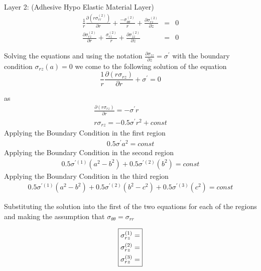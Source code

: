 \documentclass[11pt]{article} %
\makeatletter
\def \beg {\begin{equation}}
\def \en {\end{equation}}
\newcommand{\getproperty}[2]{%
  \expandafter\ifx\csname#1@p#2\endcsname\relax
  \else \csname#1@p#2\endcsname
  \fi
}%
\makeatother
\begin{document}
Layer 2: (Adhesive Hypo Elastic Material Layer)
		\beg
		\begin{aligned}
			\frac{1}{r}\frac{\partial(r\sigma_{rr}^{(2)})}{\partial r} + \frac {- \sigma_{\theta\theta}^{(2)}}{r} +  
					\frac{\partial \sigma_{rz}^{(2)}}{\partial z}  & =  &  0 \\
			\frac{\partial \sigma_{rz}^{(2)}}{\partial r} + \frac {\sigma_{rz}^{(2)}}{r} +  
					\frac{\partial \sigma_{zz}^{(2)}}{\partial z} & = & 0
		\end{aligned}
		\en

Solving the equations and using the notation $ \frac{\partial \sigma_{zz}}{\partial z}  = \sigma^{'}$  with the boundary condition $ \sigma_{rz} (a) = 0 $ we come to the following solution of the equation
	\beg
	\frac{1}{r}\frac{\partial (r\sigma_{rz})}{\partial r} +  \sigma^{'}   = 0
	\en

as 
	\beg
		\begin{aligned}
			\frac{\partial (r\sigma_{rz})}{\partial r} = -\sigma^{'}{r} \\
			r\sigma_{rz} =  -0.5 \sigma^{'}{r}^{2} + const 
		\end{aligned}
	\en
	Applying the Boundary Condition in the first region 
	\beg
		\begin{aligned}
			0.5 \sigma^{'}{a}^{2} =  const 
		\end{aligned}
	\en
	Applying the Boundary Condition in the second region 
	\beg
		\begin{aligned}
			0.5 \sigma^{'(1)}({a}^{2} - {b}^{2}) + 0.5 \sigma ^{'(2)}({b}^{2}) =  const 
		\end{aligned}
	\en
	Applying the Boundary Condition in the third region 
	\beg
		\begin{aligned}
			0.5 \sigma^{'(1)}({a}^{2} - {b}^{2}) + 0.5 \sigma ^{'(2)}({b}^{2} - {c}^{2}) + 0.5 \sigma ^{'(3)}({c}^2)=  const  
		\end{aligned}
	\en

	Substituting the solution into the first of the two equations for each of the regions and making the assumption that  $ \sigma_{\theta\theta} = \sigma_{rr}$


	\beg
		\boxed{
		\begin{aligned}
			\sigma_{rz}^{(1)} & = \getproperty{sigma}{1}\\
			\sigma_{rz}^{(2)} & = \getproperty{sigma}{2} \\ 
			\sigma_{rz}^{(3)} & = \getproperty{sigma}{3}
		\end{aligned}
		}
	\en		
\end{document}
